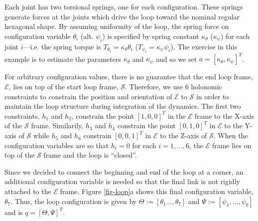 \documentclass[letterpaper, 10pt, conference]{ieeeconf}
\begin{document}
Each joint has two torsional springs, one for each configuration.  These springs generate forces at the joints which drive the loop toward the nominal regular hexagonal shape.  By assuming uniformity of the loop, the spring force on configuration variable $\theta_i$ (alt. $\psi_i$) is specified by spring constant $\kappa_{\theta}$ ($\kappa_{\psi}$) for each joint $i$---i.e. the spring torque is $T_{\theta_i} = \kappa_{\theta}\theta_i$ ($T_{\psi_i} = \kappa_{\psi}\psi_i$).  The exercise in this example is to estimate the parameters $\kappa_{\theta}$ and $\kappa_{\psi}$ and so we set $a = [\kappa_{\theta},\kappa_{\psi}]^T$.  

For arbitrary configuration values, there is no guarantee that the end loop frame, $\mathcal{E}$, lies on top of the start loop frame, $\mathcal{S}$. Therefore, we use 6 holonomic constraints to constrain the position and orientation of $\mathcal{E}$ to $\mathcal{S}$ in order to maintain the loop structure during integration of the dynamics.  The first two constraints, $h_1$ and $h_2$, constrain the point $[1, 0, 0]^T$ in the $\mathcal{E}$ frame to the X-axis of the $\mathcal{S}$ frame. Similarily, $h_3$ and $h_4$ constrain the point $[0,1,0]^T$ in $\mathcal{E}$ to the Y-axis of $\mathcal{S}$ while $h_5$ and $h_6$ constrain $[0,0,1]^T$ in $\mathcal{E}$ to the Z-axis of $\mathcal{S}$.  When the configuration variables are so that $h_i = 0$ for each $i = 1,\ldots,6$, the $\mathcal{E}$ frame lies on top of the $\mathcal{S}$ frame and the loop is ``closed''. 

Since we decided to connect the beginning and end of the loop at a corner, an additional configuration variable is needed so that the final link is not rigidly attached to the $\mathcal{E}$ frame.  Figure \ref{fig-loop}a shows this final configuration variable, $\theta_7$.  Thus, the loop configuration is given by $\Theta:=[\theta_1\ldots,\theta_7]$ and $\Psi:=[\psi_1,\ldots,\psi_6]$ and is $q = [\Theta,\Psi]^T$.  
\end{document}
